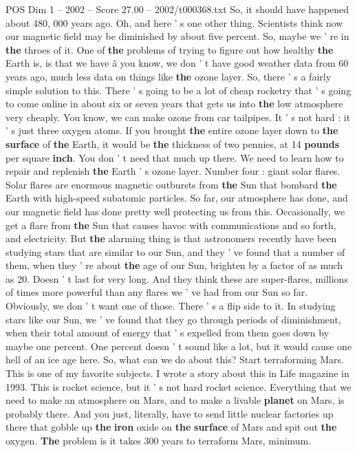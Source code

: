 \begin{textsample}{POS Dim 1 – 2002 – Score 27.00 – 2002/t000368.txt}
So, it should have happened about 480, 000 years ago.
Oh, and here ' s one other thing.
Scientists think now our magnetic field may be diminished by about five percent.
So, maybe we ' re in \textbf{the} throes of it.
One of \textbf{the} problems of trying to figure out how healthy \textbf{the} Earth is, is that we have â you know, we don ' t have good weather data from 60 years ago, much less data on things like \textbf{the} ozone layer.
So, there ' s a fairly simple solution to this.
There ' s going to be a lot of cheap rocketry that ' s going to come online in about six or seven years that gets us into \textbf{the} low atmosphere very cheaply.
You know, we can make ozone from car tailpipes.
It ' s not hard : it ' s just three oxygen atoms.
If you brought \textbf{the} entire ozone layer down to \textbf{the} \textbf{surface} of \textbf{the} Earth, it would be \textbf{the} thickness of two pennies, at 14 \textbf{pounds} per square \textbf{inch}.
You don ' t need that much up there.
We need to learn how to repair and replenish \textbf{the} Earth ' s ozone layer.
Number four : giant solar flares.
Solar flares are enormous magnetic outbursts from \textbf{the} Sun that bombard \textbf{the} Earth with high-speed subatomic particles.
So far, our atmosphere has done, and our magnetic field has done pretty well protecting us from this.
Occasionally, we get a flare from \textbf{the} Sun that causes havoc with communications and so forth, and electricity.
But \textbf{the} alarming thing is that astronomers recently have been studying stars that are similar to our Sun, and they ' ve found that a number of them, when they ' re about \textbf{the} age of our Sun, brighten by a factor of as much as 20.
Doesn ' t last for very long.
And they think these are super-flares, millions of times more powerful than any flares we ' ve had from our Sun so far.
Obviously, we don ' t want one of those.
There ' s a flip side to it.
In studying stars like our Sun, we ' ve found that they go through periods of diminishment, when their total amount of energy that ' s expelled from them goes down by maybe one percent.
One percent doesn ' t sound like a lot, but it would cause one hell of an ice age here.
So, what can we do about this?
Start terraforming Mars.
This is one of my favorite subjects.
I wrote a story about this in Life magazine in 1993.
This is rocket science, but it ' s not hard rocket science.
Everything that we need to make an atmosphere on Mars, and to make a livable \textbf{planet} on Mars, is probably there.
And you just, literally, have to send little nuclear factories up there that gobble up \textbf{the} \textbf{iron} oxide on \textbf{the} \textbf{surface} of Mars and spit out \textbf{the} oxygen. \textbf{The} problem is it takes 300 years to terraform Mars, minimum.

\end{textsample}
